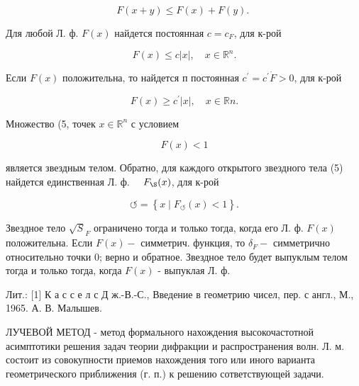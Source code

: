 \documentclass[10pt]{article}
\begin{document}
\[

F(x+y) \leqslant F(x)+F(y) \text {. }

\]



Для любой Л. ф. $F(x)$ найдется постоянная $c=c_{F}$, для к-рой



\[

F(x) \leqslant c|x|, \quad x \in \mathbb{R}^{n} .

\]



Если $F(x)$ положительна, то найдется п постоянная $c^{\prime}=c^{\prime} \dot{F}>0$, для к-рой



\[

F(x) \geqslant c^{\prime}|x|, \quad x \in \mathbb{R} n .

\]



Множество (5, точек $x \in \mathbb{R}^{n}$ с условием



\[

F(x)<1

\]



является звездным телом. Обратно, для каждого открытого звездного тела (5) найдется единственная Л. ф. $\quad F_{\S}(x)$, для к-рой



\[

\circlearrowleft=\left\{x \mid F_{\circlearrowleft}(x)<1\right\} .

\]



Звездное тело $\sqrt{S}_{F}$ ограничено тогда и только тогда, когда его Л. ф. $F(x)$ положительна. Если $F(x)-$ симметрич. функция, то $\delta_{F}-$ симметрично относительно точки 0; верно и обратное. Звездное тело будет выпуклым телом тогда и только тогда, когда $F(x)$ - выпуклая Л. ф.



Лит.: [1] К а с с е л с Д ж.-В.-С., Введение в геометрию чисел, пер. с англ., М., 1965. А. В. Малышев.



ЛУЧЕВОЙ МЕТОД - метод формального нахождения высокочастотной асимптотики решения задач теории дифракции и распространения волн. Л. м. состоит из совокупности приемов нахождения того или иного варианта геометрического приближения (г. п.) к решению сответствующей задачи.
\end{document}
